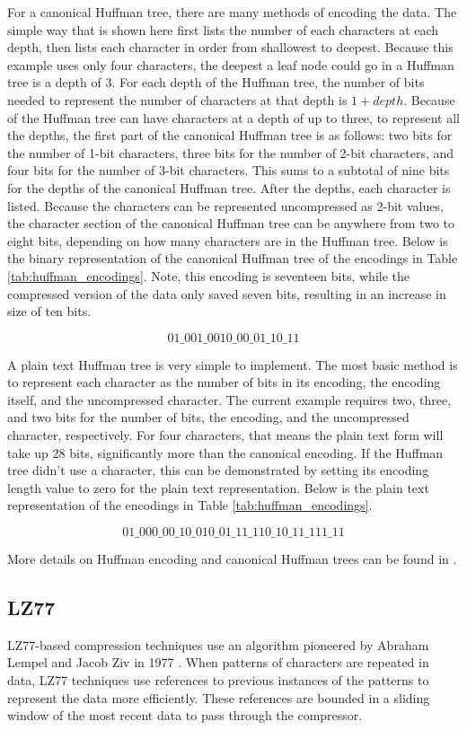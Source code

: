 \documentclass[doublespace,nopageskip]{VTthesis}
\begin{document}
For a canonical Huffman tree, there are many methods of encoding the data. The simple way that is shown here first lists the number of each characters at each depth, then lists each character in order from shallowest to deepest. Because this example uses only four characters, the deepest a leaf node could go in a Huffman tree is a depth of 3. For each depth of the Huffman tree, the number of bits needed to represent the number of characters at that depth is $1+depth$. Because of the Huffman tree can have characters at a depth of up to three, to represent all the depths, the first part of the canonical Huffman tree is as follows: two bits for the number of 1-bit characters, three bits for the number of 2-bit characters, and four bits for the number of 3-bit characters. This sums to a subtotal of nine bits for the depths of the canonical Huffman tree. After the depths, each character is listed. Because the characters can be represented uncompressed as 2-bit values, the character section of the canonical Huffman tree can be anywhere from two to eight bits, depending  on how many characters are in the Huffman tree. Below is the binary representation of the canonical Huffman tree of the encodings in Table \ref{tab:huffman_encodings}. Note, this encoding is seventeen bits, while the compressed version of the data only saved seven bits, resulting in an increase in size of ten bits.

\[01\_001\_0010\_00\_01\_10\_11\]

A plain text Huffman tree is very simple to implement. The most basic method is to represent each character as the number of bits in its encoding, the encoding itself, and the uncompressed character. The current example requires two, three, and two bits for the number of bits, the encoding, and the uncompressed character, respectively. For four characters, that means the plain text form will take up 28 bits, significantly more than the canonical encoding. If the Huffman tree didn't use a character, this can be demonstrated by setting its encoding length value to zero for the plain text representation. Below is the plain text representation of the encodings in Table \ref{tab:huffman_encodings}.

\[01\_000\_00\_10\_010\_01\_11\_110\_10\_11\_111\_11\]

More details on Huffman encoding and canonical Huffman trees can be found in \cite{huffman, canonicalhuffman}.

\subsection{LZ77}\label{ss:lz77}
LZ77-based compression techniques use an algorithm pioneered by Abraham Lempel and Jacob Ziv in 1977 \cite{lz77}. When patterns of characters are repeated in data, LZ77 techniques use references to previous instances of the patterns to represent the data more efficiently. These references are bounded in a sliding window of the most recent data to pass through the compressor.
\end{document}
